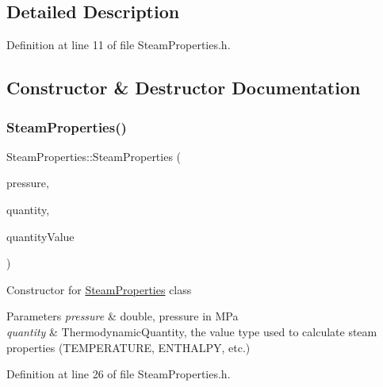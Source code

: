\subsection{Detailed Description}


Definition at line 11 of file Steam\+Properties.\+h.



\subsection{Constructor \& Destructor Documentation}
\mbox{\label{class_steam_properties_a976e08ed0433943d469a8c2f75d2ac68}} 
\subsubsection{\texorpdfstring{Steam\+Properties()}{SteamProperties()}\hspace{0.1cm}{\footnotesize\ttfamily [1/3]}}
{\footnotesize\ttfamily Steam\+Properties\+::\+Steam\+Properties (\begin{DoxyParamCaption}\item[{const double}]{pressure,  }\item[{const \hyperlink{class_steam_properties_ae0294bedf7d178c2d8fb6aed0f62fbff}{Thermodynamic\+Quantity}}]{quantity,  }\item[{const double}]{quantity\+Value }\end{DoxyParamCaption})\hspace{0.3cm}{\ttfamily [inline]}}

Constructor for \hyperlink{class_steam_properties}{Steam\+Properties} class 
\begin{DoxyParams}{Parameters}
{\em pressure} & double, pressure in M\+Pa \\
\hline
{\em quantity} & Thermodynamic\+Quantity, the value type used to calculate steam properties (T\+E\+M\+P\+E\+R\+A\+T\+U\+RE, E\+N\+T\+H\+A\+L\+PY, etc.) \\
\hline
\end{DoxyParams}


Definition at line 26 of file Steam\+Properties.\+h.

\mbox{\label{class_steam_properties_a976e08ed0433943d469a8c2f75d2ac68}} 
